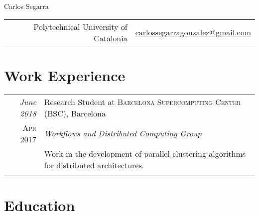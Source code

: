 \documentclass[a4paper,10pt]{article} %
\begin{document}
\pagestyle{empty} %




\vspace{-20pt}

\begin{center}
\begin{huge}
Carlos Segarra
\end{huge}

\begin{tabular}{rl}
Polytechnical University of Catalonia  & \href{mailto:carlossegarragonzalez@gmail.com}{carlossegarragonzalez@gmail.com}
\end{tabular}
\end{center}

\vspace{-5pt}

\section{Work Experience}
%
\begin{tabular}{r|p{15cm}}
\emph{June 2018} & Research Student at \textsc{Barcelona Supercomputing Center (BSC)}, Barcelona \\
\textsc{Apr 2017} & \emph{Workflows and Distributed Computing Group}\\ 
& \footnotesize{Work in the development of parallel clustering algorithms for distributed architectures.}\\
\multicolumn{2}{c}{} \\
\end{tabular}


\section{Education}
\end{document}
